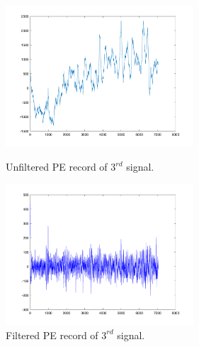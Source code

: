 \documentclass[a4paper,11pt]{article}
\begin{document}
\begin{figure}[ht!]
    \begin{minipage}{0.5\textwidth}
        \centering
        \includegraphics[width=70mm]{PE_sig3.png}
        \caption{Unfiltered PE record of $3^{rd}$ signal.}
    \end{minipage}\hfill
    \begin{minipage}{0.5\textwidth}
        \centering
        \includegraphics[width=70mm]{PE_sig3_filtered.png}
        \caption{Filtered PE record of $3^{rd}$ signal.}
    \end{minipage}\hfill
\end{figure}
\newpage
\end{document}

